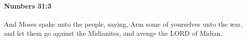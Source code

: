 
		\paragraph{Numbers 31:3} %
			\label{NUMBERS-31-3}

			And Moses spake unto the people, saying, Arm some of yourselves unto the war, and let them go against the Midianites, and avenge the LORD of Midian.


